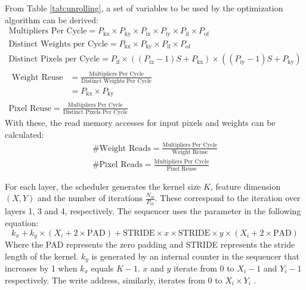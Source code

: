 \documentclass{uw-ece-wkrpt}
\begin{document}
From Table \ref{tab:unrolling}, a set of variables to be used by the optimization algorithm can be derived:
\begin{gather}
\text{Multipliers Per Cycle} = P_\mathrm{kx} \times  P_\mathrm{ky} \times  P_\mathrm{ix} \times  P_\mathrm{iy} \times P_\mathrm{if} \times  P_\mathrm{of} \\
\text{Distinct Weights per Cycle} = P_\mathrm{kx} \times  P_\mathrm{ky} \times  P_\mathrm{if} \times  P_\mathrm{of} \\
\text{Distinct Pixels per Cycle} = P_\mathrm{if} \times (( P_\mathrm{ix} - 1)S + P_\mathrm{kx}) \times (( P_\mathrm{iy} - 1)S + P_\mathrm{ky}) \\
\begin{aligned}
    \text{Weight Reuse} &= \frac{\text{Multipliers Per Cycle}}{\text{Distinct Weights Per Cycle}} \\
                        &=  P_\mathrm{kx} \times  P_\mathrm{ky}
\end{aligned} \\
\text{Pixel Reuse} = \frac{\text{Multipliers Per Cycle}}{\text{Distinct Pixels Per Cycle}}
\end{gather}
With these, the read memory accesses for input pixels and weights can be calculated:
\begin{gather}
    \text{\# Weight Reads} = \frac{\text{Multipliers Per Cycle}}{\text{Weight Reuse}} \\
    \text{\# Pixel Reads} = \frac{\text{Multipliers Per Cycle}}{\text{Pixel Reuse}}
\end{gather}

For each layer, the scheduler generates the \gls{kernel} size $K$, feature dimension $(X, Y)$ and the number of iterations $\frac{N_\mathrm{of}}{P_\mathrm{of}}$. These correspond to the iteration over layers 1, 3 and 4, respectively. The sequencer uses the parameter in the following equation:
\begin{equation}
    k_x + k_y \times (X_i + 2 \times \text{PAD}) + \text{STRIDE} \times x \times \text{STRIDE} \times y \times (X_i + 2 \times \text{PAD})
\end{equation}
Where the PAD represents the zero padding and STRIDE represents the stride length of the \gls{kernel}. $k_y$ is generated by an internal counter in the sequencer that increases by 1 when $k_x$ equals $K - 1$. $x$ and $y$ iterate from 0 to $X_i - 1$ and $Y_i - 1$ respectively. The write address, similarly, iterates from 0 to $X_i \times Y_i$ \cite{Ma2017Optimizing-Loop}.
\end{document}
